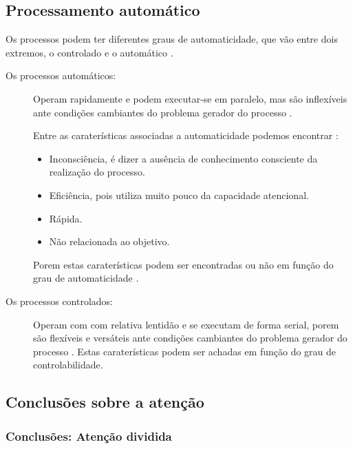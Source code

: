 \subsection{Processamento automático}
Os processos podem ter diferentes graus de automaticidade,
que vão entre dois extremos, o controlado e o automático \cite[pp. 201]{eysenck2017manual}.
\begin{description}
\item[Os processos automáticos:] Operam rapidamente e podem executar-se em paralelo, 
mas são inflexíveis ante condições cambiantes do problema gerador do processo
 \cite[pp. 198]{eysenck2017manual}.

Entre as caraterísticas associadas a automaticidade podemos encontrar \cite[pp. 198]{eysenck2017manual}:
\begin{itemize}
\item Inconsciência, é dizer a ausência de conhecimento consciente da realização do processo.
\item Eficiência, pois utiliza muito pouco da capacidade atencional.
\item Rápida.
\item Não relacionada ao objetivo.
\end{itemize}
Porem estas caraterísticas podem ser encontradas ou não 
em função do grau de automaticidade  \cite[pp. 198]{eysenck2017manual}.
\item[Os processos controlados:] Operam com com relativa lentidão e se executam de forma serial, 
porem são flexíveis e versáteis ante condições cambiantes do problema gerador do processo
 \cite[pp. 198]{eysenck2017manual}.
Estas caraterísticas podem ser achadas em função do grau de controlabilidade.
\end{description}

\subsection{Conclusões sobre a atenção}
\label{subsec:atencaodividida}

\subsubsection{Conclusões: Atenção  dividida }

